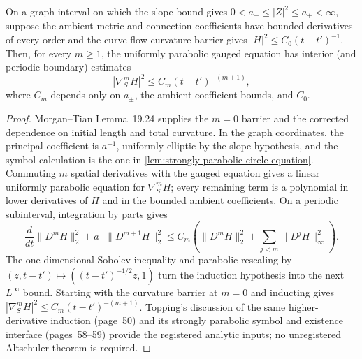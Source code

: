 \begin{lemma}
\label{lem:curve-flow-parabolic-regularity-interface}
\notready
On a graph interval on which the slope bound gives
$0<a_-\le |Z|^2\le a_+<\infty$, suppose the ambient metric and connection
coefficients have bounded derivatives of every order and the curve-flow
curvature barrier gives $|H|^2\le C_0(t-t')^{-1}$.  Then, for every $m\ge1$,
the uniformly parabolic gauged equation has interior (and periodic-boundary)
estimates
\[
 |\nabla_S^mH|^2\le C_m(t-t')^{-(m+1)},
\]
where $C_m$ depends only on $a_\pm$, the ambient coefficient bounds, and
$C_0$.
\end{lemma}
\begin{proof}
Morgan--Tian Lemma~19.24 supplies the $m=0$ barrier and the corrected
dependence on initial length and total curvature.  In the graph coordinates,
the principal coefficient is $a^{-1}$, uniformly elliptic by the slope
hypothesis, and the symbol calculation is the one in
\ref{lem:strongly-parabolic-circle-equation}.  Commuting $m$ spatial
derivatives with the gauged equation gives a linear uniformly parabolic
equation for $\nabla_S^mH$; every remaining term is a polynomial in lower
derivatives of $H$ and in the bounded ambient coefficients.  On a periodic
subinterval, integration by parts gives
\[
 \frac d{dt}\|D^mH\|_2^2+a_-\|D^{m+1}H\|_2^2
 \le C_m\left(\|D^mH\|_2^2+
       \sum_{j<m}\|D^jH\|_\infty^2\right).
\]
The one-dimensional Sobolev inequality and parabolic rescaling by
$(z,t-t')\mapsto((t-t')^{-1/2}z,1)$ turn the induction hypothesis into the
next $L^\infty$ bound.  Starting with the curvature barrier at $m=0$ and
inducting gives
$|\nabla_S^mH|^2\le C_m(t-t')^{-(m+1)}$.  Topping's discussion of the same
higher-derivative induction (page~50) and its strongly parabolic symbol and
existence interface (pages~58--59) provide the registered analytic inputs;
no unregistered Altschuler theorem is required.
\end{proof}

